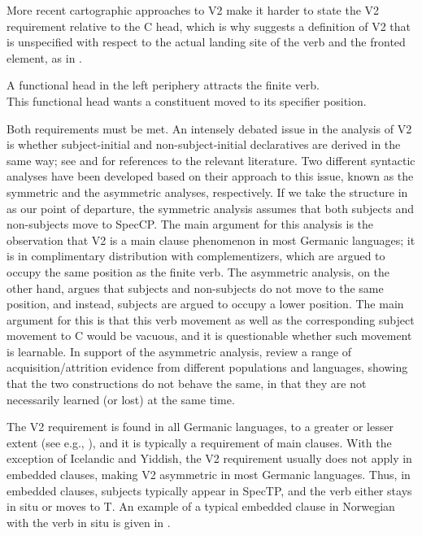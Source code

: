 \documentclass[output=paper]{langscibook}
\begin{document}
More recent cartographic approaches to V2 make it harder to state the V2 requirement relative to the C head, which is why \citet[375]{Holmberg2015} suggests a definition of V2 that is unspecified with respect to the actual landing site of the verb and the fronted element‚ as in .

\ea%
    \label{ex:anderssen:3}
    \ea A functional head in the left periphery attracts the finite verb.\\
  \ex  This functional head wants a constituent moved to its specifier position.
\z
\z

Both requirements must be met. An intensely debated issue in the analysis of V2 is whether subject\hyp initial and non\hyp subject\hyp initial declaratives are derived in the same way; see \citet{Holmberg2015} and \citet{WestergaardLohndalAlexiadou2019} for references to the relevant literature. Two different syntactic analyses have been developed based on their approach to this issue, known as the symmetric and the asymmetric analyses, respectively. If we take the structure in  as our point of departure, the symmetric analysis assumes that both subjects and non-subjects move to SpecCP. The main argument for this analysis is the observation that V2 is a main clause phenomenon in most Germanic languages; it is in complimentary distribution with complementizers, which are argued to occupy the same position as the finite verb. The asymmetric analysis, on the other hand, argues that subjects and non-subjects do not move to the same position, and instead, subjects are argued to occupy a lower position. The main argument for this is that this verb movement as well as the corresponding subject movement to C would be vacuous, and it is questionable whether such movement is learnable. In support of the asymmetric analysis, \citet{WestergaardLohndalAlexiadou2019} review a range of acquisition/attrition evidence from different populations and languages, showing that the two constructions do not behave the same, in that they are not necessarily learned (or lost) at the same time.

The V2 requirement is found in all Germanic languages, to a greater or lesser extent (see e.g., \citealt{Westergaard2007,Westergaard2008,Westergaard2009Microvariation}), and it is typically a requirement of main clauses. With the exception of Icelandic and Yiddish, the V2 requirement usually does not apply in embedded clauses, making V2 asymmetric in most Germanic languages. Thus, in embedded clauses, subjects typically appear in SpecTP, and the verb either stays in situ or moves to T. An example of a typical embedded clause in Norwegian with the verb in situ is given in .
\end{document}
